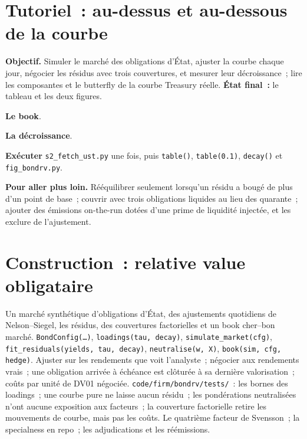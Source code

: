 \section{Tutoriel~: au-dessus et au-dessous de la courbe}\label{tut:s2:government-bond-relative-value:tut}

\begin{tutorial}
\textbf{Objectif.} Simuler le marché des obligations d'État, ajuster la courbe chaque jour, négocier les résidus avec trois couvertures, et mesurer leur décroissance~; lire les composantes et le butterfly de la courbe
Treasury réelle. \textbf{État final~:} le tableau et les deux figures.
\begin{tutsteps}
\item \textbf{Le book}.
\label{lst:s2:government-bond-relative-value:book}
\item \textbf{La décroissance}.
\label{lst:s2:government-bond-relative-value:decay}
\item \textbf{Exécuter} \texttt{s2\_fetch\_ust.py} une fois, puis \texttt{table()}, \texttt{table(0.1)}, \texttt{decay()} et \texttt{fig\_bondrv.py}.
\end{tutsteps}
\textbf{Pour aller plus loin.} Rééquilibrer seulement lorsqu'un résidu a bougé de plus d'un point de base~; couvrir avec trois obligations liquides au lieu des quarante~;
ajouter des émissions on-the-run dotées d'une prime de liquidité injectée, et les exclure de l'ajustement.
\end{tutorial}

\section{Construction~: relative value obligataire}\label{bld:s2:government-bond-relative-value:bondrv}

\begin{build}
 Un marché synthétique d'obligations d'État, des ajustements quotidiens de Nelson--Siegel, les résidus, des couvertures factorielles et un book cher--bon marché.
 \texttt{BondConfig(\dots)}, \texttt{loadings(tau, decay)}, \texttt{simulate\_market(cfg)},
\texttt{fit\_residuals(yields, tau, decay)}, \texttt{neutralise(w, X)}, \texttt{book(sim, cfg, hedge)}.
 Ajuster sur les rendements que voit l'analyste~; négocier aux rendements vrais~; une obligation arrivée à échéance est clôturée à sa dernière valorisation~; coûts par unité de DV01 négociée.
 \texttt{code/firm/bondrv/tests/}~: les bornes des loadings~; une courbe pure ne laisse aucun résidu~; les pondérations neutralisées n'ont aucune
exposition aux facteurs~; la couverture factorielle retire les mouvements de courbe, mais pas les coûts.
 Le quatrième facteur de Svensson~; la specialness en repo~; les adjudications et les réémissions.
\end{build}

